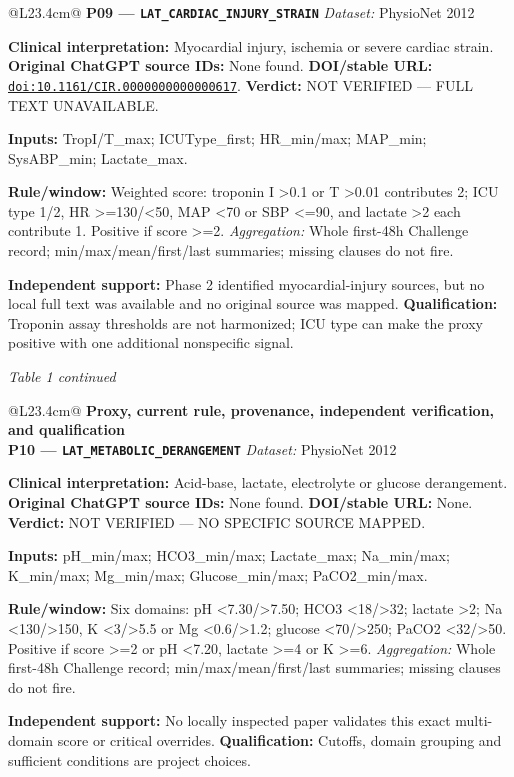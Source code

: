 \begin{tabular}{@{}L{23.4cm}@{}}
\addlinespace[3pt]
\midrule
\textbf{P09 --- \nolinkurl{LAT_CARDIAC_INJURY_STRAIN}} \hfill \textit{Dataset:} PhysioNet 2012\par\textbf{Clinical interpretation:} Myocardial injury, ischemia or severe cardiac strain. \textbf{Original ChatGPT source IDs:} None found. \textbf{DOI/stable URL:} \href{https://doi.org/10.1161/CIR.0000000000000617}{\nolinkurl{doi:10.1161/CIR.0000000000000617}}. \textbf{Verdict:} NOT VERIFIED --- FULL TEXT UNAVAILABLE.\par\textbf{Inputs:} TropI/T\_max; ICUType\_first; HR\_min/max; MAP\_min; SysABP\_min; Lactate\_max.\par\textbf{Rule/window:} Weighted score: troponin I >0.1 or T >0.01 contributes 2; ICU type 1/2, HR >=130/<50, MAP <70 or SBP <=90, and lactate >2 each contribute 1. Positive if score >=2. \textit{Aggregation:} Whole first-48h Challenge record; min/max/mean/first/last summaries; missing clauses do not fire.\par\textbf{Independent support:} Phase 2 identified myocardial-injury sources, but no local full text was available and no original source was mapped. \textbf{Qualification:} Troponin assay thresholds are not harmonized; ICU type can make the proxy positive with one additional nonspecific signal. \\
\addlinespace[3pt]
\midrule
\bottomrule
\end{tabular}
\clearpage
\textit{Table 1 continued}\par
\begin{tabular}{@{}L{23.4cm}@{}}
\toprule
\textbf{Proxy, current rule, provenance, independent verification, and qualification}\\
\midrule
\textbf{P10 --- \nolinkurl{LAT_METABOLIC_DERANGEMENT}} \hfill \textit{Dataset:} PhysioNet 2012\par\textbf{Clinical interpretation:} Acid-base, lactate, electrolyte or glucose derangement. \textbf{Original ChatGPT source IDs:} None found. \textbf{DOI/stable URL:} None. \textbf{Verdict:} NOT VERIFIED --- NO SPECIFIC SOURCE MAPPED.\par\textbf{Inputs:} pH\_min/max; HCO3\_min/max; Lactate\_max; Na\_min/max; K\_min/max; Mg\_min/max; Glucose\_min/max; PaCO2\_min/max.\par\textbf{Rule/window:} Six domains: pH <7.30/>7.50; HCO3 <18/>32; lactate >2; Na <130/>150, K <3/>5.5 or Mg <0.6/>1.2; glucose <70/>250; PaCO2 <32/>50. Positive if score >=2 or pH <7.20, lactate >=4 or K >=6. \textit{Aggregation:} Whole first-48h Challenge record; min/max/mean/first/last summaries; missing clauses do not fire.\par\textbf{Independent support:} No locally inspected paper validates this exact multi-domain score or critical overrides. \textbf{Qualification:} Cutoffs, domain grouping and sufficient conditions are project choices. \\
\addlinespace[3pt]
\midrule
\bottomrule
\end{tabular}
